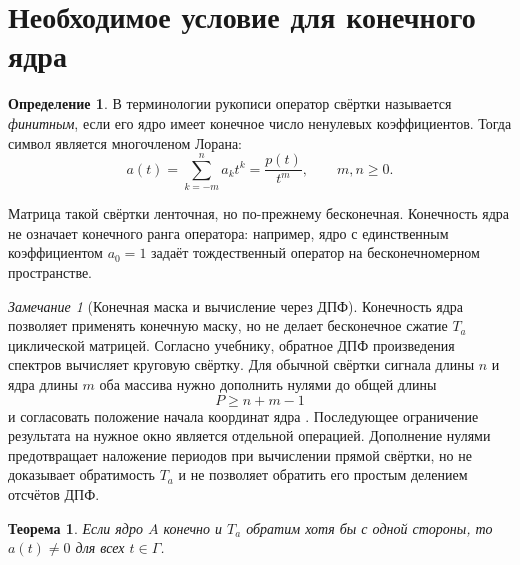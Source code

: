 \documentclass[12pt,a4paper]{article}
\newtheorem{theorem}{Теорема}
\theoremstyle{definition}
\newtheorem{definition}{Определение}
\theoremstyle{remark}
\newtheorem*{remark}{Замечание}
\begin{document}
\section{Необходимое условие для конечного ядра}

\begin{definition}
В терминологии рукописи оператор свёртки называется \emph{финитным},
если его ядро имеет конечное число ненулевых коэффициентов.
Тогда символ является многочленом Лорана:
\[
  a(t)=\sum_{k=-m}^{n}a_kt^k=\frac{p(t)}{t^m},\qquad m,n\geqslant0.
\]
\end{definition}

Матрица такой свёртки ленточная, но по-прежнему бесконечная.
Конечность ядра не означает конечного ранга оператора:
например, ядро с единственным коэффициентом $a_0=1$ задаёт
тождественный оператор на бесконечномерном пространстве.

\begin{remark}[Конечная маска и вычисление через ДПФ]
Конечность ядра позволяет применять конечную маску, но не делает
бесконечное сжатие $T_a$ циклической матрицей. Согласно учебнику,
обратное ДПФ произведения спектров вычисляет круговую свёртку.
Для обычной свёртки сигнала длины $n$ и ядра длины $m$ оба массива
нужно дополнить нулями до общей длины
\[
  P\geqslant n+m-1
\]
и согласовать положение начала координат ядра
\cite[\S\,4.6.6, с.~298--300, формула (4.6-26)]{GW2012}.
Последующее ограничение результата на нужное окно является
отдельной операцией. Дополнение нулями предотвращает наложение
периодов при вычислении прямой свёртки, но не доказывает обратимость
$T_a$ и не позволяет обратить его простым делением отсчётов ДПФ.
\end{remark}

\begin{theorem}
Если ядро $A$ конечно и $T_a$ обратим хотя бы с одной стороны,
то $a(t)\ne0$ для всех $t\in\Gamma$.
\end{theorem}
\end{document}
